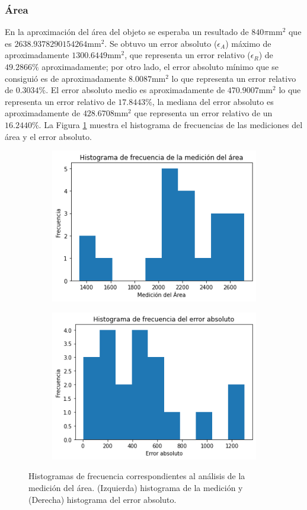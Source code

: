 \subsubsection{Área}


En la aproximación del área del objeto se esperaba un resultado de $840\pi\text{mm}^2$ que es $2638.9378290154264\text{mm}^2$. Se obtuvo un error absoluto ($\epsilon_A$) máximo de aproximadamente $1300.6449\text{mm}^2$, que representa un error relativo ($\epsilon_R$) de $49.2866\%$ aproximadamente; por otro lado, el error absoluto mínimo que se consiguió es de aproximadamente $8.0087\text{mm}^2$ lo que representa un error relativo de $0.3034\%$. El error absoluto medio es aproximadamente de $470.9007\text{mm}^2$ lo que representa un error relativo de $17.8443\%$, la mediana del error absoluto es aproximadamente de $428.6708\text{mm}^2$ que representa un error relativo de un $16.2440\%$. La Figura \ref{fig:histA} muestra el histograma de frecuencias de las mediciones del área y el error absoluto.

\begin{figure}[ht]
	\centering
	\begin{subfigure}
		\centering
		\includegraphics[width=.49\linewidth]{./Graphics/histA.png}
	\end{subfigure}
	\begin{subfigure}
		\centering
		\includegraphics[width=.49\linewidth]{./Graphics/histAEA.png}
	\end{subfigure}
	\caption{Histogramas de frecuencia correspondientes al análisis de la medición del área. (Izquierda) histograma de la medición y (Derecha) histograma del error absoluto.}
	\label{fig:histA}
\end{figure}


